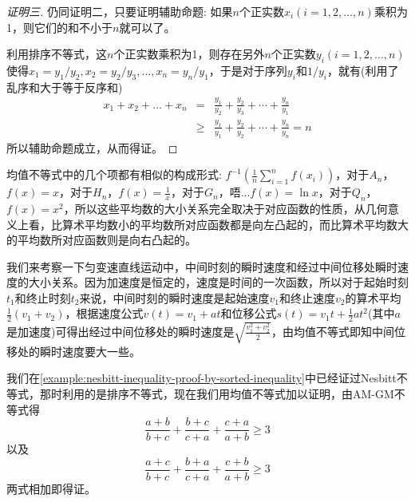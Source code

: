 \begin{proof}[证明三]
  仍同证明二，只要证明辅助命题: 如果$n$个正实数$x_i(i=1,2,\ldots,n)$乘积为1，则它们的和不小于$n$就可以了。

  利用排序不等式，这$n$个正实数乘积为1，则存在另外$n$个正实数$y_i(i=1,2,\dots,n)$使得$x_1=y_1/y_2,x_2=y_2/y_3,\dots,x_n=y_n/y_1$，于是对于序列$y_i$和$1/y_i$，就有(利用了乱序和大于等于反序和)
  \begin{eqnarray*}
    x_1+x_2+\dots+x_n & = & 
                            \frac{y_1}{y_2}+\frac{y_2}{y_3}+\cdots+\frac{y_n}{y_1} \\
    & \geqslant & \frac{y_1}{y_1}+\frac{y_2}{y_2}+\cdots+\frac{y_n}{y_n} = n
  \end{eqnarray*}
  所以辅助命题成立，从而得证。
\end{proof}

\begin{example}
  均值不等式中的几个项都有相似的构成形式: $f^{-1}\left( \frac{1}{n}\sum_{i=1}^nf(x_i) \right)$，对于$A_n$，$f(x)=x$，对于$H_n$，$f(x)=\frac{1}{x}$，对于$G_n$，唔...$f(x)=\ln{x}$，对于$Q_n$，$f(x)=x^2$，所以这些平均数的大小关系完全取决于对应函数的性质，从几何意义上看，比算术平均数小的平均数所对应函数都是向左凸起的，而比算术平均数大的平均数所对应函数则是向右凸起的。
\end{example}

\begin{example}[匀变速直线运动中间时刻瞬时速度和中间位移瞬时速度的大小]
  我们来考察一下匀变速直线运动中，中间时刻的瞬时速度和经过中间位移处瞬时速度的大小关系。因为加速度是恒定的，速度是时间的一次函数，所以对于起始时刻$t_1$和终止时刻$t_2$来说，中间时刻的瞬时速度是起始速度$v_1$和终止速度$v_2$的算术平均$\frac{1}{2}(v_1+v_2)$，根据速度公式$v(t)=v_1+at$和位移公式$s(t)=v_1t+\frac{1}{2}at^2$(其中$a$是加速度)可得出经过中间位移处的瞬时速度是$\sqrt{\frac{v_1^2+v_2^2}{2}}$，由均值不等式即知中间位移处的瞬时速度要大一些。
\end{example}

\begin{example}
  \label{example:nesbitt-inequality-proof-by-am-gm-inequality}
  我们在\autoref{example:nesbitt-inequality-proof-by-sorted-inequality}中已经证过Nesbitt不等式，那时利用的是排序不等式，现在我们用均值不等式加以证明，由AM-GM不等式得
  \[ \frac{a+b}{b+c}+\frac{b+c}{c+a}+\frac{c+a}{a+b} \geqslant 3 \]
以及
\[ \frac{a+c}{b+c}+\frac{b+a}{c+a}+\frac{c+b}{a+b} \geqslant 3 \]
两式相加即得证。
\end{example}


